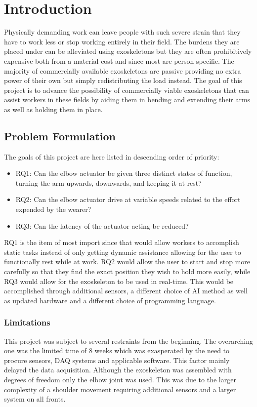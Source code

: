 \section{Introduction}
\label{section:intro}

Physically demanding work can leave people with such severe strain that they have to work less or stop working entirely in 
their field\cite{WorkDemands}. The burdens they are placed under can be alleviated using exoskeletons but they are often 
prohibitively expensive both from a material cost and since most are person-specific. The majority of commercially available 
exoskeletons are passive providing no extra power of their own but simply redistributing the load instead. The goal of this 
project is to advance the possibility of commercially viable exoskeletons that can assist workers in these fields by aiding 
them in bending and extending their arms as well as holding them in place.

\subsection{Problem Formulation}
The goals of this project are here listed in descending order of priority:
\begin{itemize}
        
    \item RQ1: Can the elbow actuator be given three distinct states of function, turning the arm upwards, downwards, and keeping it at rest?

    \item RQ2: Can the elbow actuator drive at variable speeds related to the effort expended by the wearer?

    \item RQ3: Can the latency of the actuator acting be reduced?

\end{itemize}
RQ1 is the item of most import since that would allow workers to accomplish static tasks instead of only getting dynamic assistance 
allowing for the user to functionally rest while at work. RQ2 would allow the user to start and stop more carefully so that they 
find the exact position they wish to hold more easily, while RQ3 would allow for the exoskeleton to be used in real-time.
This would be accomplished through additional sensors, a different choice of AI method as well as updated hardware and a different 
choice of programming language.



\subsubsection{Limitations}
This project was subject to several restraints from the beginning. The overarching one was the limited time of 8 weeks which was
exasperated by the need to procure sensors, DAQ systems and applicable software. This factor mainly delayed the data acquisition. 
Although the exoskeleton was assembled with degrees of freedom only the elbow joint was used. This was due to the larger complexity 
of a shoulder movement requiring additional sensors and a larger system on all fronts.

